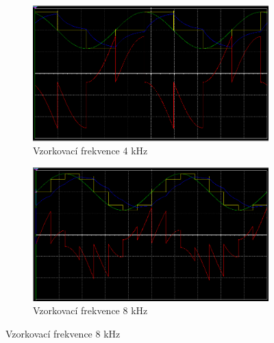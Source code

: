 \documentclass[twoside]{article}
\begin{document}
\begin{figure}[h]
    \centering
    \begin{subfigure}{0.45\textwidth}
        \includegraphics[width=\textwidth]{rekonstrukce-4kHz.png}
        \caption{Vzorkovací frekvence 4 kHz}
    \end{subfigure}
    \begin{subfigure}{0.45\textwidth}
        \includegraphics[width=\textwidth]{rekonstrukce-8kHz.png}
        \caption{Vzorkovací frekvence 8 kHz}
    \end{subfigure}


\end{figure}
\end{document}
